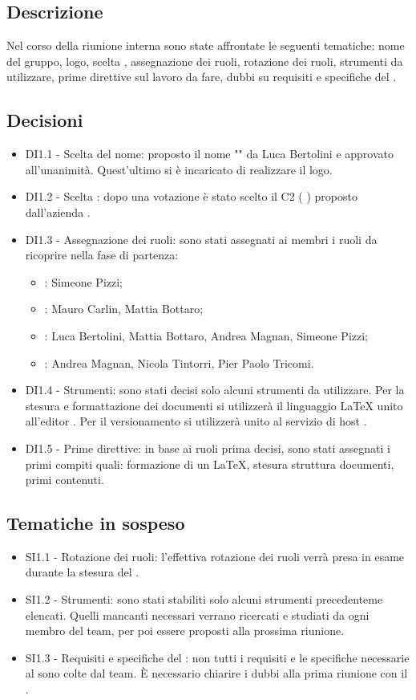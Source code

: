 \documentclass[a4paper,titlepage]{article}
\begin{document}
 \subsection{Descrizione}
 Nel corso della riunione interna sono state affrontate le seguenti tematiche: nome del gruppo, logo, scelta , assegnazione dei ruoli, rotazione dei ruoli, strumenti da utilizzare, prime direttive sul lavoro da fare, dubbi su requisiti e specifiche del .
 \subsection{Decisioni}
 \begin{itemize}
  \item DI1.1 - Scelta del nome: proposto il nome "\GRUPPO" da Luca Bertolini e approvato all'unanimità. Quest'ultimo si è incaricato di realizzare il logo.
  \item DI1.2 - Scelta : dopo una votazione è stato scelto il  C2 ( \PROGETTO) proposto dall'azienda \PROPONENTE.
  \item DI1.3 - Assegnazione dei ruoli: sono stati assegnati ai membri i ruoli da ricoprire nella fase di partenza:
  \begin{itemize}
  \item \RESP: Simeone Pizzi;
  \item \AMMP: Mauro Carlin, Mattia Bottaro;
  \item \VERP: Luca Bertolini, Mattia Bottaro, Andrea Magnan, Simeone Pizzi;
  \item \ANP: Andrea Magnan, Nicola Tintorri, Pier Paolo Tricomi.
  \end{itemize}
  \item DI1.4 - Strumenti: sono stati decisi solo alcuni strumenti da utilizzare. Per la stesura e formattazione dei documenti si utilizzerà il linguaggio \LaTeX{}{} unito all'editor . Per il versionamento si utilizzerà  unito al servizio di host . 
  \item DI1.5 - Prime direttive: in base ai ruoli prima decisi, sono stati assegnati i primi compiti quali: formazione di un  \LaTeX{}{}, stesura struttura documenti, primi contenuti.
 \end{itemize}

\subsection{Tematiche in sospeso} 
  \begin{itemize}
  \item SI1.1 - Rotazione dei ruoli: l'effettiva rotazione dei ruoli verrà presa in esame durante la stesura del \PPdoc.
  \item SI1.2 - Strumenti: sono stati stabiliti solo alcuni strumenti precedenteme elencati. Quelli mancanti necessari verrano ricercati e studiati da ogni membro del team, per poi essere proposti alla prossima riunione.
  \item SI1.3 - Requisiti e specifiche del : non tutti i requisiti e le specifiche necessarie al  sono colte dal team. È necessario chiarire i dubbi alla prima riunione con il .
  \end{itemize}
\end{document}
